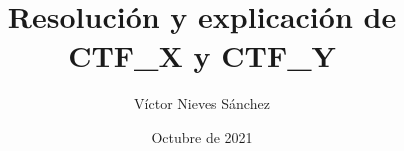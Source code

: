 \documentclass[a4paper, 12pt]{article} %
\author{Víctor Nieves Sánchez}
\date{Octubre de 2021}
\title{Resolución y explicación de CTF\_X y CTF\_Y}
\begin{document}
\maketitle
\null
\newpage


%        

\newpage
\tableofcontents

\newpage
\listoffigures

\newpage
\listoftables

\newpage
\lstlistoflistings

\newpage
\printglossary[type=\acronymtype]

\newpage
\begin{otherlanguage}{spanish}
    \renewcommand{\spanishabstractname}{Resumen}
    \begin{abstract}
        \normalsize
        
    \end{abstract}
\end{otherlanguage}

\newpage
\begin{abstract}
    \normalsize
    
\end{abstract}

\newpage
{} %
\UseRawInputEncoding %

\newpage
\printbibliography[heading=bibnumbered] %
\end{document}

